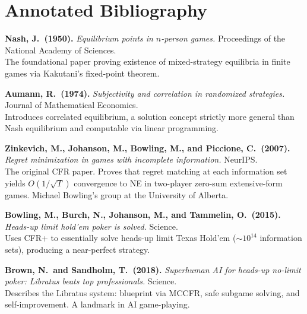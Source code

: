 \documentclass[11pt,a4paper]{article}
\theoremstyle{plain}
\theoremstyle{definition}
\begin{document}
\section{Annotated Bibliography}\label{sec:biblio}

\begin{enumerate}[label={[\arabic*]}, leftmargin=*, itemsep=6pt]

\item \textbf{Nash, J.\ (1950).}  \emph{Equilibrium points in $n$-person
  games.}  Proceedings of the National Academy of Sciences.\\
  The foundational paper proving existence of mixed-strategy equilibria in
  finite games via Kakutani's fixed-point theorem.

\item \textbf{Aumann, R.\ (1974).}  \emph{Subjectivity and correlation in
  randomized strategies.}  Journal of Mathematical Economics.\\
  Introduces correlated equilibrium, a solution concept strictly more
  general than Nash equilibrium and computable via linear programming.

\item \textbf{Zinkevich, M., Johanson, M., Bowling, M., and Piccione, C.\
  (2007).}  \emph{Regret minimization in games with incomplete
  information.}  NeurIPS.\\
  The original CFR paper.  Proves that regret matching at each
  information set yields $O(1/\sqrt{T})$ convergence to NE in
  two-player zero-sum extensive-form games.  Michael Bowling's group at
  the University of Alberta.

\item \textbf{Bowling, M., Burch, N., Johanson, M., and Tammelin, O.\
  (2015).}  \emph{Heads-up limit hold'em poker is solved.}  Science.\\
  Uses CFR+ to essentially solve heads-up limit Texas Hold'em
  ($\sim\!10^{14}$ information sets), producing a near-perfect
  strategy.

\item \textbf{Brown, N.\ and Sandholm, T.\ (2018).}  \emph{Superhuman AI
  for heads-up no-limit poker: Libratus beats top professionals.}
  Science.\\
  Describes the Libratus system: blueprint via MCCFR, safe subgame
  solving, and self-improvement.  A landmark in AI game-playing.


\end{enumerate}
\end{document}
